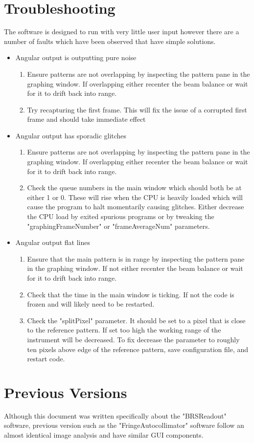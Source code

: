 \documentclass{article}
\begin{document}
\section{Troubleshooting}
The software is designed to run with very little user input however there are a number of faults which have been observed that have simple solutions.
\begin{itemize}
\item Angular output is outputting pure noise
\begin{enumerate}
\item Ensure patterns are not overlapping by inspecting the pattern pane in the graphing window. If overlapping either recenter the beam balance or wait for it to drift back into range.
\item Try recapturing the first frame. This will fix the issue of a corrupted first frame and should take immediate effect
\end{enumerate}
\item Angular output has sporadic glitches
\begin{enumerate}
\item Ensure patterns are not overlapping by inspecting the pattern pane in the graphing window. If overlapping either recenter the beam balance or wait for it to drift back into range.
\item Check the queue numbers in the main window which should both be at either 1 or 0. These will rise when the CPU is heavily loaded which will cause the program to halt momentarily causing glitches. Either decrease the CPU load by exited spurious programs or by tweaking the "graphingFrameNumber" or "frameAverageNum" parameters.
\end{enumerate}
\item Angular output flat lines
\begin{enumerate}
\item Ensure that the main pattern is in range by inspecting the pattern pane in the graphing window. If not either recenter the beam balance or wait for it to drift back into range.
\item Check that the time in the main window is ticking. If not the code is frozen and will likely need to be restarted.
\item Check the "splitPixel" parameter. It should be set to a pixel that is close to the reference pattern. If set too high the working range of the instrument will be decreased. To fix decrease the parameter to roughly ten pixels above edge of the reference pattern, save configuration file, and restart code.
\end{enumerate}
\end{itemize}
\section{Previous Versions}
Although this document was written specifically about the "BRSReadout" software, previous version such as the "FringeAutocollimator" software follow an almost identical image analysis and have similar GUI components.

{}
\end{document}
